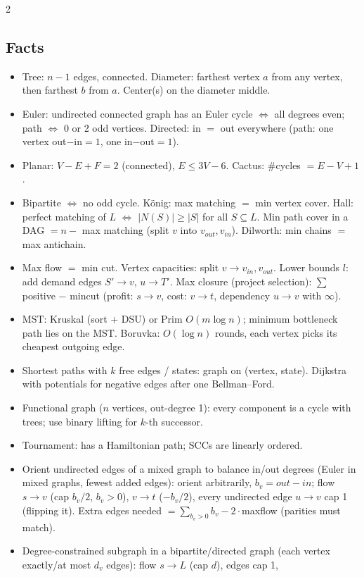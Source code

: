 \documentclass[8pt,a4paper]{extarticle}
\begin{document}
\begin{multicols*}{2}
\subsection{Facts}
\begin{itemize}
\item Tree: $n-1$ edges, connected. Diameter: farthest vertex $a$ from any
  vertex, then farthest $b$ from $a$. Center(s) on the diameter middle.
\item Euler: undirected connected graph has an Euler cycle $\iff$ all degrees
  even; path $\iff$ 0 or 2 odd vertices. Directed: in $=$ out everywhere
  (path: one vertex out$-$in$=1$, one in$-$out$=1$).
\item Planar: $V-E+F=2$ (connected), $E\le3V-6$. Cactus: \#cycles $=E-V+1$.
\item Bipartite $\iff$ no odd cycle. König: max matching $=$ min vertex cover.
  Hall: perfect matching of $L$ $\iff$ $|N(S)|\ge|S|$ for all $S\subseteq L$.
  Min path cover in a DAG $=n-$ max matching (split $v$ into $v_{out},v_{in}$).
  Dilworth: min chains $=$ max antichain.
\item Max flow $=$ min cut. Vertex capacities: split $v\to v_{in},v_{out}$.
  Lower bounds $l$: add demand edges $S'\to v$, $u\to T'$.
  Max closure (project selection): $\sum$ positive $-$ mincut
  (profit: $s\to v$, cost: $v\to t$, dependency $u\to v$ with $\infty$).
\item MST: Kruskal (sort + DSU) or Prim $O(m\log n)$; minimum
  bottleneck path lies on the MST. Boruvka: $O(\log n)$ rounds, each vertex
  picks its cheapest outgoing edge.
\item Shortest paths with $k$ free edges / states: graph on (vertex, state).
  Dijkstra with potentials for negative edges after one Bellman--Ford.
\item Functional graph ($n$ vertices, out-degree 1): every component is
  a cycle with trees; use binary lifting for $k$-th successor.
\item Tournament: has a Hamiltonian path; SCCs are linearly ordered.
\item Orient undirected edges of a mixed graph to balance in/out degrees
  (Euler in mixed graphs, fewest added edges): orient arbitrarily,
  $b_v=out-in$; flow $s\to v$ (cap $b_v/2$, $b_v>0$), $v\to t$
  ($-b_v/2$), every undirected edge $u\to v$ cap 1 (flipping it). Extra
  edges needed $=\sum_{b_v>0} b_v - 2\cdot$maxflow (parities must match).
\item Degree-constrained subgraph in a bipartite/directed graph (each
  vertex exactly/at most $d_v$ edges): flow $s\to L$ (cap $d$), edges cap 1,

\end{itemize}
\end{multicols*}
\end{document}
